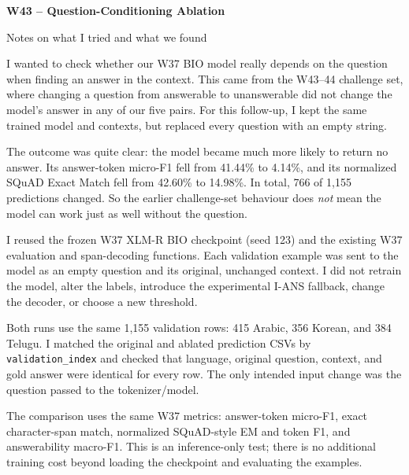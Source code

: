\documentclass[10pt,a4paper]{article}
\newcommand{\sectionline}[1]{\vspace{2pt}{\large\bfseries #1}\par\vspace{0pt}}
\begin{document}
\fontsize{9.5}{12.1}\selectfont
\begin{center}
{\Large\bfseries W43 -- Question-Conditioning Ablation}\par\vspace{3pt}
{\normalsize Notes on what I tried and what we found}
\end{center}
\vspace{-6pt}

\sectionline{Quick summary}
I wanted to check whether our W37 BIO model really depends on the question when finding an answer in the context. This came from the W43--44 challenge set, where changing a question from answerable to unanswerable did not change the model's answer in any of our five pairs. For this follow-up, I kept the same trained model and contexts, but replaced every question with an empty string.

The outcome was quite clear: the model became much more likely to return no answer. Its answer-token micro-F1 fell from 41.44\% to 4.14\%, and its normalized SQuAD Exact Match fell from 42.60\% to 14.98\%. In total, 766 of 1,155 predictions changed. So the earlier challenge-set behaviour does \emph{not} mean the model can work just as well without the question.

\sectionline{1. What I changed in the code}
I reused the frozen W37 XLM-R BIO checkpoint (seed 123) and the existing W37 evaluation and span-decoding functions. Each validation example was sent to the model as an empty question and its original, unchanged context. I did not retrain the model, alter the labels, introduce the experimental I-ANS fallback, change the decoder, or choose a new threshold.

Both runs use the same 1,155 validation rows: 415 Arabic, 356 Korean, and 384 Telugu. I matched the original and ablated prediction CSVs by \texttt{validation\_index} and checked that language, original question, context, and gold answer were identical for every row. The only intended input change was the question passed to the tokenizer/model.

The comparison uses the same W37 metrics: answer-token micro-F1, exact character-span match, normalized SQuAD-style EM and token F1, and answerability macro-F1. This is an inference-only test; there is no additional training cost beyond loading the checkpoint and evaluating the examples.
\end{document}
